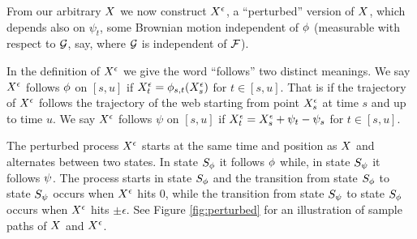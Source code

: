 {

{
\newcommand{\joinernoargs}{\psi}
\newcommand{\joiner}[2]{\joinernoargs_{{#1}{#2}}}
\newcommand{\joinerval}[1]{\joinernoargs_{#1}}
  From our arbitrary $X$ we now construct $X^{\epsilon}$, a
  ``perturbed'' version of $X$, which depends also on
  $\joinerval{t}$,
  some Brownian motion independent of $\phi$ (measurable with
  respect to $\mathcal{G}$, say, where $\mathcal{G}$ is independent of
  $\mathcal{F}$).

  In the definition of $X^{\epsilon}$
  we give the word ``follows'' two distinct meanings.
  We say $X^{\epsilon}$ follows $\phi$ on $[s,u]$ if
  $X^{\epsilon}_t = \phi_{{s},{t}}(X^{\epsilon}_s)$ for $t \in [s,u]$.
  That is if the trajectory of $X^{\epsilon}$ follows the trajectory of
  the web starting from point $X^{\epsilon}_s$ at time $s$ and up to time $u$.
  We say $X^{\epsilon}$ follows $\joinernoargs$ on $[s,u]$ if
  $\resamplede_t = \resamplede_s + \joinerval{t} - \joinerval{s}$ for $t \in [s,u]$.

\begin{definition}
  \label{def:resamplede}
  The perturbed process $X^{\epsilon}$ starts at the same time and position
  as $X$ and
  alternates between two states.
  In state $S_{\phi}$ it follows
  $\phi$ while, in state $S_{\psi}$ it follows $\psi$.
  The process starts in state $S_{\phi}$ and
  the transition from state $S_{\phi}$ to state $S_{\psi}$ occurs
  when $X^{\epsilon}$ hits $0$, while
  the transition from state $S_{\psi}$ to state $S_{\phi}$ occurs when
  $X^{\epsilon}$ hits $\pm \epsilon$.
  See Figure \ref{fig:perturbed} for an illustration of sample paths of
  $X$ and $X^{\epsilon}$.
\end{definition}
}

}
